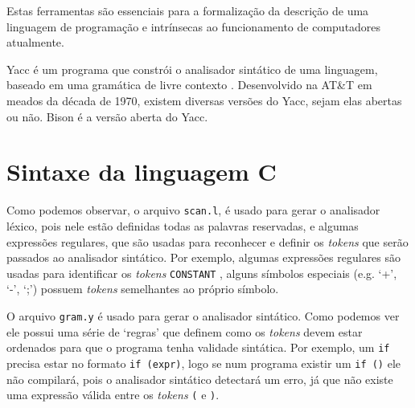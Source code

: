 \documentclass[a4paper,twocolumn,10pt]{article}
\begin{document}
Estas ferramentas são essenciais para a formalização da descrição de uma
linguagem de programação e intrínsecas ao funcionamento de computadores
atualmente.

Yacc é um programa que constrói o analisador sintático de uma linguagem,
baseado em uma gramática de livre contexto . Desenvolvido na AT\&T em meados da
década de 1970, existem diversas versões do Yacc, sejam elas abertas ou não.
Bison é a versão aberta do Yacc.

\section{Sintaxe da linguagem C}

Como podemos observar, o arquivo \texttt{scan.l}, é usado para gerar o
analisador léxico, pois nele estão definidas todas as palavras reservadas, e
algumas expressões regulares, que são usadas para reconhecer e definir os
\textit{tokens} que serão passados ao analisador sintático. Por exemplo,
algumas expressões regulares são usadas para identificar os \textit{tokens}
\texttt{CONSTANT} , alguns símbolos especiais (e.g. `+', `-', `;') possuem
\textit{tokens} semelhantes ao próprio símbolo.

O arquivo \texttt{gram.y} é usado para gerar o analisador sintático. Como
podemos ver ele possui uma série de `regras' que definem como os
\textit{tokens} devem estar ordenados para que o programa tenha validade
sintática. Por exemplo, um \texttt{if} precisa estar no formato \texttt{if
(expr)}, logo se num programa existir um \texttt{if ()} ele não compilará, pois
o analisador sintático detectará um erro, já que não existe uma expressão
válida entre os \textit{tokens} \texttt{(} e \texttt{)}.
\end{document}
